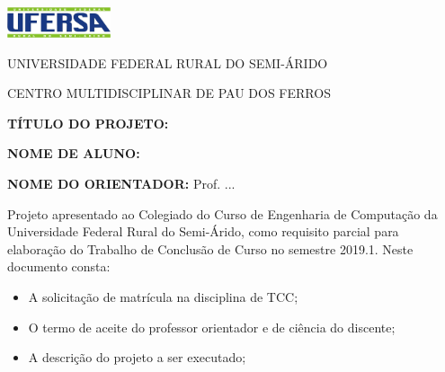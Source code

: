 \documentclass[12pt,openright,oneside,a4paper,ruledheader,pnumromarab,english]{abntex2}
\begin{document}

\begin{capa}
 
\begin{minipage}{0.25\textwidth}
\includegraphics[height=0.9cm]{logo-ufersa.png} 
\end{minipage}
\hfill
\begin{minipage}{0.74\textwidth}
UNIVERSIDADE FEDERAL RURAL DO SEMI-ÁRIDO \par
CENTRO MULTIDISCIPLINAR DE PAU DOS FERROS

  \MakeUppercase  \imprimircurso
\end{minipage}

\vspace{1cm}
\hspace{-1cm}
 \textbf{TÍTULO DO PROJETO:} 


\vspace{0.25cm}
\hspace{-1cm}
 \textbf{NOME DE ALUNO:} %


%
 

\vspace{0.25cm}
\hspace{-1cm}
 \textbf{NOME DO ORIENTADOR:} Prof. ...

\vspace{1cm}
\hspace{-1.25cm}Projeto apresentado ao Colegiado do Curso de Engenharia de Computação da Universidade Federal Rural do Semi-Árido, como requisito parcial para elaboração do Trabalho de Conclusão de Curso no semestre 2019.1. Neste documento consta:

\begin{itemize}
    \item A solicitação de matrícula na disciplina de TCC;
    \item O termo de aceite do professor orientador e de ciência do discente;
    \item A descrição do projeto a ser executado;
\end{itemize}


\end{capa}
\end{document}
